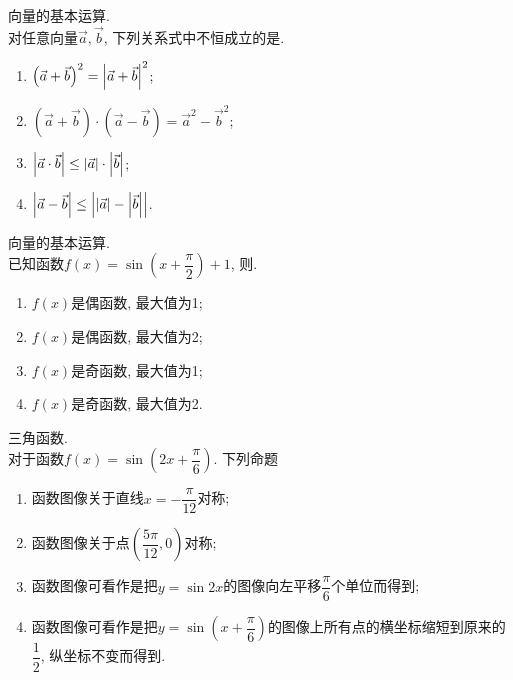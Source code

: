 \documentclass[8pt]{article}
\begin{document}
		 向量的基本运算.
		~\\

		 对任意向量\(\vec{a}, \vec{b}\), 下列关系式中不恒成立的是.

		\begin{multicols}{2}
			\begin{enumerate}[label = \calword{\Alph*.}]
				\item \(\left(\vec{a} + \vec{b}\right)^2 = \left\lvert \vec{a} + \vec{b} \right\rvert^2\);
				\item \(\left(\vec{a} + \vec{b}\right) \cdot \left(\vec{a} - \vec{b}\right) = \vec{a}^2 - \vec{b}^2\);
				\item \(\left\lvert \vec{a} \cdot \vec{b} \right\rvert \leq \left\lvert \vec{a} \right\rvert \cdot \left\lvert \vec{b} \right\rvert\);
				\item \(\left\lvert \vec{a} - \vec{b} \right\rvert \leq \left\lvert \left\lvert \vec{a} \right\rvert - \left\lvert \vec{b} \right\rvert \right\rvert\).
			\end{enumerate}
		\end{multicols}

		 向量的基本运算.
		~\\

		 已知函数\(f(x) = \sin \left(x + \dfrac{\pi}{2}\right) + 1\), 则\answord{B}.

		\begin{multicols}{2}
			\begin{enumerate}[label = \calword{\Alph*.}]
				\item \(f(x)\)是偶函数, 最大值为1;
				\item \(f(x)\)是偶函数, 最大值为2;
				\item \(f(x)\)是奇函数, 最大值为1;
				\item \(f(x)\)是奇函数, 最大值为2.
			\end{enumerate}
		\end{multicols}

		 三角函数.
		~\\

		 对于函数\(f(x) = \sin \left(2x + \dfrac{\pi}{6}\right)\). 下列命题

		\begin{enumerate}[label = \calword{\arabic*.}]
			\item 函数图像关于直线\(x = -\dfrac{\pi}{12}\)对称;
			\item 函数图像关于点\(\left(\dfrac{5\pi}{12}, 0\right)\)对称;
			\item 函数图像可看作是把\(y = \sin 2x\)的图像向左平移\(\dfrac{\pi}{6}\)个单位而得到;
			\item 函数图像可看作是把\(y = \sin\left(x + \dfrac{\pi}{6}\right)\)的图像上所有点的横坐标缩短到原来的\(\dfrac{1}{2}\), 纵坐标不变而得到.
		\end{enumerate}
\end{document}
